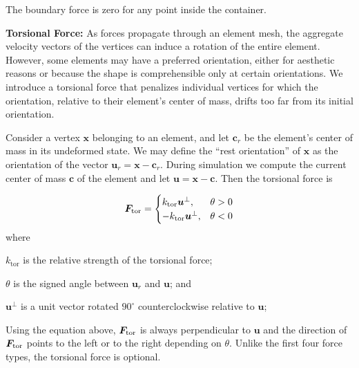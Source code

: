 The boundary force is zero for any point inside the container.

\medskip
\textbf{Torsional Force:} 
As forces propagate through an element mesh, the aggregate velocity
vectors of the vertices can induce a rotation of the entire element.
However, some elements may have a preferred orientation,
either for aesthetic reasons or because the shape is comprehensible only at certain orientations.
We introduce a torsional force that
penalizes individual vertices for which the orientation, relative to their
element's center of mass, drifts too far from its initial orientation.

Consider a vertex $\bm{x}$ belonging
to an element, and let $\bm{c}_r$ be the element's center of mass in
its undeformed state.  We may define the ``rest orientation'' of
$\bm{x}$ as the orientation of the vector $\bm{u}_r = \bm{x}-\bm{c}_r$.
During simulation we compute the current center of mass $\bm{c}$ of 
the element and let $\bm{u}=\bm{x}-\bm{c}$.  Then the torsional force
is

\begin{equation}
  \bm{F}_\mathrm{tor} =\begin{cases}
    k_\mathrm{tor}\bm{u}^\perp, & \theta > 0\\
    -k_\mathrm{tor}\bm{u}^\perp, & \theta < 0
  \end{cases}
\end{equation}
where
\begin{packeddescriptions}
	\item[$k_\mathrm{tor}$]  is the relative strength of the torsional force;
	\item[$\theta$] is the signed angle between $\bm{u}_r$ and $\bm{u}$; and
	\item[$\bm{u}^\perp$] is a unit vector rotated $90^\circ$
		counterclockwise relative to $\bm{u}$;
\end{packeddescriptions}

Using the equation above, $\bm{F}_\mathrm{tor}$ is always perpendicular to $\bm{u}$
and the direction of $\bm{F}_\mathrm{tor}$ points to the left or to the right depending on $\theta$.
Unlike the first four force types, the torsional force is optional.

